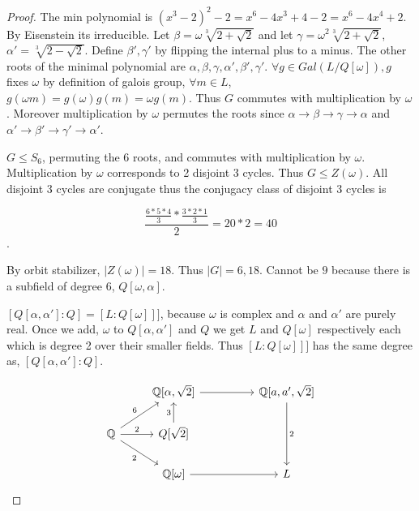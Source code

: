 \documentclass{article}
\newcommand{\Q}{\mathbb{Q}}
\begin{document}
\begin{proof}
    The min polynomial is $(x^3 - 2)^2 - 2 = x^6 - 4x^3 + 4 - 2 = x^6 - 4x^4 + 2$. By Eisenstein its irreducible. Let $\beta =  \omega \sqrt[3]{2 + \sqrt{2}}$ and let $\gamma = \omega^2 \sqrt[3]{2 + \sqrt{2}}$, $\alpha' = \sqrt[3]{2 - \sqrt{2}}$. Define $\beta', \gamma'$ by flipping the internal plus to a minus. The other roots of the minimal polynomial are $\alpha, \beta, \gamma, \alpha', \beta', \gamma'$. $\forall g \in Gal(L / Q[\omega]), g$ fixes $\omega$ by definition of galois group, $\forall m \in L$, $g(\omega m) = g(\omega) g(m) = \omega g(m)$. Thus $G$ commutes with multiplication by $\omega$. Moreover multiplication by $\omega$ permutes the roots since $\alpha \to \beta \to \gamma \to \alpha$ and $\alpha' \to \beta' \to \gamma' \to \alpha'$. 
    
    $G \leq S_6$, permuting the 6 roots, and commutes with multiplication by $\omega$. Multiplication by $\omega$ corresponds to 2 disjoint 3 cycles. Thus $G \leq Z(\omega)$.  All disjoint 3 cycles are conjugate thus the conjugacy class of disjoint 3 cycles is 
    
    \begin{equation*}
        \frac{\frac{6 * 5 * 4}{3} * \frac{3 * 2 *1}{3}}{2} = 20 * 2 = 40
    \end{equation*}. 

    By orbit stabilizer, $|Z(\omega)| = 18$. Thus $|G| = 6, 18$. Cannot be $9$ because there is a subfield of degree $6$, $Q[\omega, \alpha]$.
    
    $[Q[\alpha, \alpha'] : Q] = [L: Q[\omega]]]$, because $\omega$ is complex and $\alpha$ and $\alpha'$ are purely real. Once we add, $\omega$ to $Q[\alpha, \alpha']$ and $Q$ we get $L$ and $Q[\omega]$ respectively each which is degree 2 over their smaller fields. Thus $[L: Q[\omega]]]$ has the same degree as, $[Q[\alpha, \alpha'] : Q]$. 
    

    \[\begin{tikzcd}
        & {\Q[\alpha, \sqrt{2}]} && {\Q[a, a', \sqrt{2}]} \\
        \Q & {Q[\sqrt{2}]} \\
        & {\Q[\omega]} && L
        \arrow[from=1-2, to=1-4]
        \arrow["2", from=1-4, to=3-4]
        \arrow["6", from=2-1, to=1-2]
        \arrow["2", from=2-1, to=2-2]
        \arrow["2"', from=2-1, to=3-2]
        \arrow["3", from=2-2, to=1-2]
        \arrow[from=3-2, to=3-4]
    \end{tikzcd}\]
    

\end{proof}
\end{document}
